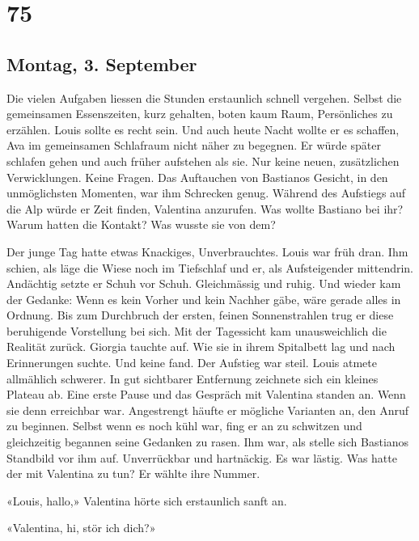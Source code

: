 \chapter{75}

\section{Montag, 3. 
September}



Die vielen Aufgaben liessen die Stunden erstaunlich schnell vergehen.
Selbst die gemeinsamen Essenszeiten, kurz gehalten, boten kaum Raum,
Persönliches zu erzählen. Louis sollte es recht sein. Und auch heute
Nacht wollte er es schaffen, Ava im gemeinsamen
Schlafraum nicht näher zu begegnen. Er würde später schlafen gehen und auch
früher aufstehen als sie. Nur keine neuen, zusätzlichen Verwicklungen.
Keine Fragen. Das Auftauchen von Bastianos Gesicht, in den unmöglichsten
Momenten, war ihm Schrecken genug.
Während des Aufstiegs auf die Alp würde er Zeit finden, Valentina
anzurufen. Was wollte Bastiano bei ihr? Warum hatten die Kontakt? Was
wusste sie von dem?

\sectionbreak

Der junge Tag hatte etwas Knackiges, Unverbrauchtes. Louis war früh dran. Ihm schien, als läge die Wiese noch im Tiefschlaf und er, als Aufsteigender mittendrin. Andächtig setzte er Schuh vor Schuh. Gleichmässig und ruhig. Und wieder kam der Gedanke: Wenn es kein Vorher und kein Nachher gäbe, wäre gerade alles in Ordnung. Bis zum Durchbruch der ersten, feinen Sonnenstrahlen trug er diese beruhigende Vorstellung bei sich. Mit der Tagessicht kam unausweichlich die Realität zurück. Giorgia tauchte auf. Wie sie in ihrem Spitalbett lag und nach Erinnerungen suchte. Und keine fand. 
Der Aufstieg war steil. Louis atmete allmählich schwerer. In gut
sichtbarer Entfernung zeichnete sich ein kleines Plateau ab. Eine erste
Pause und das Gespräch mit Valentina standen an. Wenn sie denn
erreichbar war. Angestrengt häufte er mögliche Varianten an, den Anruf
zu beginnen. Selbst wenn es noch kühl war, fing er an zu
schwitzen und gleichzeitig begannen seine Gedanken zu rasen. Ihm war, als
stelle sich Bastianos Standbild vor ihm auf. Unverrückbar und 
hartnäckig. Es war lästig. Was hatte der mit Valentina zu tun? 
Er wählte ihre Nummer.

«Louis, hallo,» Valentina hörte sich erstaunlich sanft an.

«Valentina, hi, stör ich dich?»

